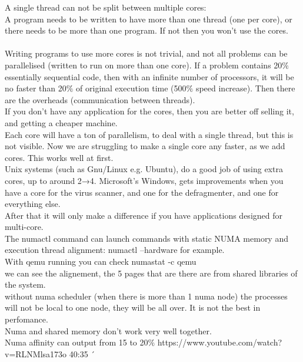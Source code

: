 \documentclass[11pt, a4paper, oneside]{article}
\theoremstyle{definition}
\begin{document}
A single thread can not be split between multiple cores:
\\
A program needs to be written to have more than one thread (one per core), or there needs to be more than one program. If not then you won't use the cores.\\
\\
Writing programs to use more cores is not trivial, and not all problems can be parallelised (written to run on more than one core). If a problem contains 20$\%$ essentially sequential code, then with an infinite number of processors, it will be no faster than 20$\%$ of original execution time (500$\%$ speed increase). Then there are the overheads (communication between threads).
\\
If you don't have any application for the cores, then you are better off selling it, and getting a cheaper machine.
\\
Each core will have a ton of parallelism, to deal with a single thread, but this is not visible. Now we are struggling to make a single core any faster, as we add cores. This works well at first.\\

Unix systems (such as Gnu/Linux e.g. Ubuntu), do a good job of using extra cores, up to around 2→4. Microsoft's Windows, gets improvements when you have a core for the virus scanner, and one for the defragmenter, and one for everything else.
\\
After that it will only make a difference if you have applications designed for multi-core.\\

The numactl command can launch commands with static NUMA memory and execution thread alignment: numactl --hardware for example.\\

With qemu running you can check numastat -c qemu\\
we can see the alignement, the 5 pages that are there are from shared libraries of the system.\\

without numa scheduler (when there is more than 1 numa node) the processes will not be local to one node, they will be all over. It is not the best in perfomance.\\

Numa and shared memory don't work very well together.\\

Numa affinity can output from 15 to 20$\%$ https://www.youtube.com/watch?v=RLNMlsa173o 40:35
´ 
\end{document}
